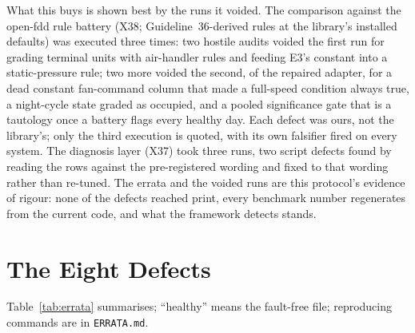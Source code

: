 \documentclass[runningheads]{llncs}
\begin{document}
What this buys is shown best by the runs it voided. The comparison against the open-fdd rule battery (X38; Guideline~36-derived rules at the library's installed defaults) was executed three times: two hostile audits voided the first run for grading terminal units with air-handler rules and feeding E3's constant into a static-pressure rule; two more voided the second, of the repaired adapter, for a dead constant fan-command column that made a full-speed condition always true, a night-cycle state graded as occupied, and a pooled significance gate that is a tautology once a battery flags every healthy day. Each defect was ours, not the library's; only the third execution is quoted, with its own falsifier fired on every system. The diagnosis layer (X37) took three runs, two script defects found by reading the rows against the pre-registered wording and fixed to that wording rather than re-tuned. The errata and the voided runs are this protocol's evidence of rigour: none of the defects reached print, every benchmark number regenerates from the current code, and what the framework detects stands.

\section{The Eight Defects}
\label{sec:defects}

Table~\ref{tab:errata} summarises; ``healthy'' means the fault-free file; reproducing commands are in \texttt{ERRATA.md}.
\end{document}
